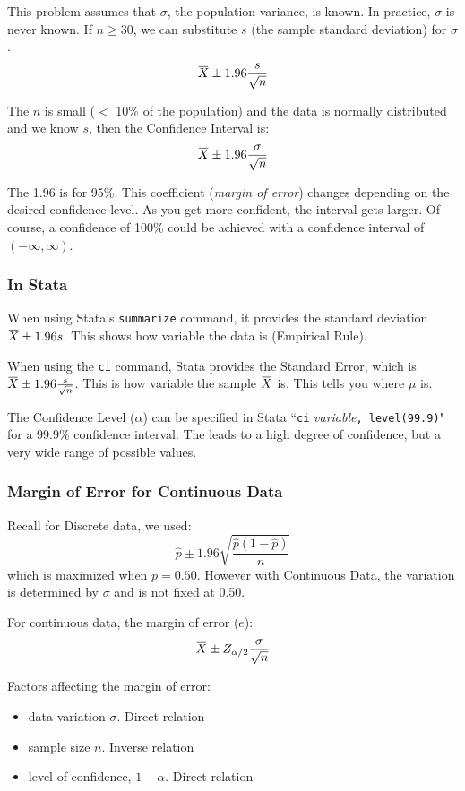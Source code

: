 \documentclass[11pt, oneside]{article}   	%
\newcommand{\overbar}[1]{\mkern 1.5mu\overline{\mkern-1.5mu#1\mkern-1.5mu}\mkern 1.5mu}
\begin{document}
This problem assumes that $\sigma$, the population variance, is known. In practice, $\sigma$ is never known. If $n  \geq 30$, we can substitute $s$ (the sample standard deviation) for $\sigma$. 
\[
\overbar{X} \pm1.96\frac{s} {\sqrt{n}}
\]

The $n$ is small ($<$ 10\% of the population) and the data is normally distributed and we know $s$, then the Confidence Interval is:
\[
\overbar{X} \pm1.96\frac{\sigma} {\sqrt{n}}
\]

The 1.96 is for 95\%. This coefficient (\textit{margin of error}) changes depending on the desired confidence level. As you get more confident, the interval gets larger. Of course, a confidence of 100\% could be achieved with a confidence interval of $(-\infty, \infty)$.

\subsubsection{In Stata}

When using Stata's \texttt{summarize} command, it provides the standard deviation $\overbar{X} \pm1.96 s$. This shows how variable the data is (Empirical Rule).

When using the \texttt{ci} command, Stata provides the Standard Error, which is $\overbar{X} \pm1.96 \frac{s} {\sqrt{n}}$. This is how variable the sample $\overbar{X}$ is. This tells you where $\mu$ is.

The Confidence Level ($\alpha$) can be specified in Stata ``\texttt{ci} \textit{variable}\texttt{, level(99.9)}" for a 99.9\% confidence interval. The leads to a high degree of confidence, but a very wide range of possible values.

\subsubsection{Margin of Error for Continuous Data}
Recall for Discrete data, we used:
\[
\hat{p} \pm 1.96 \sqrt{ \frac{\hat{p}(1-\hat{p})} {n} }
\]
which is maximized when $p = 0.50$. However with Continuous Data, the variation is determined by $\sigma$ and is not fixed at 0.50.

For continuous data, the margin of error ($e$):
\[
\overbar{X} \pm Z_{\alpha / 2} \frac{\sigma} {\sqrt{n}}
\]

Factors affecting the margin of error:
\begin{itemize}
\item{data variation $\sigma$. Direct relation}
\item{sample size $n$. Inverse relation}
\item{level of confidence, $1-\alpha$. Direct relation}
\end{itemize}
\end{document}

